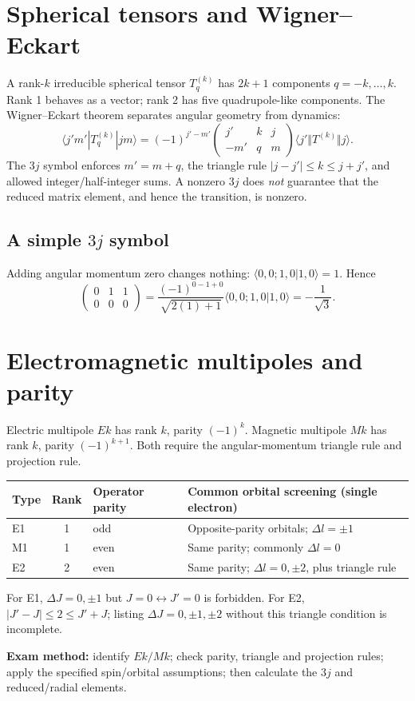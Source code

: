 
\section{Spherical tensors and Wigner--Eckart}
A rank-\(k\) irreducible spherical tensor \(T_q^{(k)}\) has
\(2k+1\) components \(q=-k,\dots,k\). Rank 1 behaves as a vector;
rank 2 has five quadrupole-like components. The Wigner--Eckart theorem
separates angular geometry from dynamics:
\[
\boxed{\langle j'm'|T_q^{(k)}|jm\rangle
=(-1)^{j'-m'}
\begin{pmatrix}j'&k&j\\-m'&q&m\end{pmatrix}
\langle j'\Vert T^{(k)}\Vert j\rangle.}
\]
The \(3j\) symbol enforces \(m'=m+q\), the triangle rule
\(|j-j'|\le k\le j+j'\), and allowed integer/half-integer sums.
A nonzero \(3j\) does \emph{not} guarantee that the reduced matrix
element, and hence the transition, is nonzero.

\subsection{A simple \(3j\) symbol}
Adding angular momentum zero changes nothing:
\(\langle0,0;1,0|1,0\rangle=1\). Hence
\[
\begin{pmatrix}0&1&1\\0&0&0\end{pmatrix}
=\frac{(-1)^{0-1+0}}{\sqrt{2(1)+1}}
\langle0,0;1,0|1,0\rangle=-\frac1{\sqrt3}.
\]

\section{Electromagnetic multipoles and parity}
Electric multipole \(Ek\) has rank \(k\), parity \((-1)^k\).
Magnetic multipole \(Mk\) has rank \(k\), parity \((-1)^{k+1}\).
Both require the angular-momentum triangle rule and projection rule.

\begin{center}
\begin{tabularx}{\linewidth}{@{}lclX@{}}
\toprule
Type & Rank & Operator parity & Common orbital screening (single electron)\\
\midrule
E1 & 1 & odd & Opposite-parity orbitals; \(\Delta l=\pm1\)\\
M1 & 1 & even & Same parity; commonly \(\Delta l=0\)\\
E2 & 2 & even & Same parity; \(\Delta l=0,\pm2\), plus triangle rule\\
\bottomrule
\end{tabularx}
\end{center}
For E1, \(\Delta J=0,\pm1\) but \(J=0\leftrightarrow J'=0\)
is forbidden. For E2, \(|J'-J|\le2\le J'+J\); listing
\(\Delta J=0,\pm1,\pm2\) without this triangle condition is incomplete.
\begin{methodbox}
\textbf{Exam method:} identify \(Ek/Mk\); check parity, triangle and
projection rules; apply the specified spin/orbital assumptions;
then calculate the \(3j\) and reduced/radial elements.
\end{methodbox}

